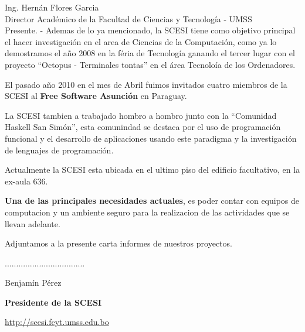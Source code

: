 \documentclass[a4paper,12pt]{letter}
\begin{document}
\begin{letter}{Ing. Hern\'an Flores Garcia\\ Director Acad\'emico de la Facultad de Ciencias y Tecnolog\'ia - UMSS \\ Presente. -}
Ademas de lo ya mencionado, la SCESI tiene como objetivo principal el hacer investigaci\'on en el area de 
Ciencias de la Computaci\'on, como ya lo demostramos el a\~no 2008 en la f\'eria de Tecnolog\'ia ganando el 
tercer lugar con el proyecto ``Octopus - Terminales tontas'' en el \'area Tecnolo\'ia de los Ordenadores. 

El pasado a\~no 2010 en el mes de Abril fuimos invitados cuatro miembros de la SCESI al {\bfseries Free Software 
Asunci\'on} en Paraguay.

La SCESI tambien a trabajado hombro a hombro junto con la ``Comunidad Haskell San Sim\'on'', esta comunindad
se destaca por el uso de programaci\'on funcional y el desarrollo de aplicaciones usando este paradigma y 
la investigaci\'on de lenguajes de programaci\'on.

Actualmente la SCESI esta ubicada en el ultimo piso del edificio facultativo, en la ex-aula 636.

{\bfseries Una de las principales necesidades actuales}, es poder contar con equipos de computacion y un ambiente seguro 
para la realizacion de las actividades que se llevan adelante.

Adjuntamos a la presente carta informes de nuestros proyectos.

\vspace{7.5cm}

\begin{center}
                \centerline{...................................}
                \centerline{Benjam\'in P\'erez}
                \centerline{{\bfseries Presidente de la SCESI}}
                \centerline{\url {http://scesi.fcyt.umss.edu.bo}}
\end{center}

\end{letter}
\end{document}
